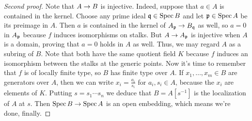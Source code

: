 \documentclass[a4paper,parskip=half,numbers=enddot, DIV=12]{scrreprt}
\begin{document}
\begin{proof}[Second proof]
	Note that $A\morphism B$ is injective. Indeed, suppose that $a\in A$ is contained in the kernel. Choose any prime ideal $\mathfrak{q}\in\operatorname{Spec} B$ and let $\mathfrak{p}\in\operatorname{Spec} A$ be its preimage in $A$. Then $a$ is contained in the kernel of $A_\pp\morphism B_\qq$ as well, so $a=0$ in $A_{\mathfrak{p}}$ because $f$ induces isomorphisms on stalks. But $A\morphism A_\pp$ is injective when $A$ is a domain, proving that $a=0$ holds in $A$ as well. Thus, we may regard $A$ as a subring of $B$. Note that both have the same quotient field $K$ because $f$ induces an isomorphism between the stalks at the generic points. Now it's time to remember that $f$ is of locally finite type, so $B$ has finite type over $A$. If $x_1,\ldots,x_m\in B$ are generators over $A$, then we can write $x_i=\frac{a_i}{s_i}$ for $a_i,s_i\in A$, because the $x_i$ are elements of $K$. Putting $s=s_1\cdots s_n$ we deduce that $B=A[s^{-1}]$ is the localization of $A$ at $s$. Then $\Spec B\morphism\Spec A$ is an open embedding, which means we're done, finally.
\end{proof}
\end{document}
